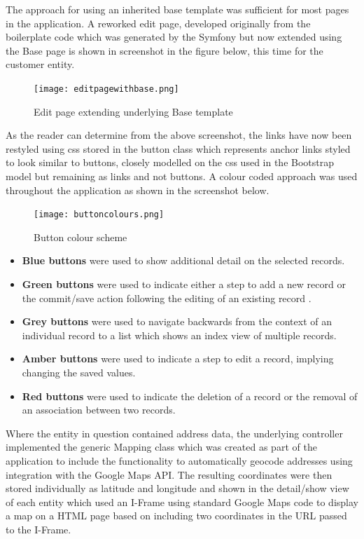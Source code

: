 \documentclass[a4paper,Times New Roman 11pt]{article}
\begin{document}
The approach for using an inherited base template was sufficient for most pages in the application. 
A reworked edit page, developed originally from the boilerplate code which was generated by the Symfony but now extended using the Base page is shown in screenshot in the figure below, this time for the customer entity.


 \begin{figure}[h!]
\texttt{[image: editpagewithbase.png]}
  \caption{Edit page extending underlying Base template}
  \label{fig:Edit page extending underlying Base template}
\end{figure}


As the reader can determine from the above screenshot, the links have now been restyled using css stored in the button class which represents anchor links styled to look similar to buttons, closely modelled on the css used in the Bootstrap model but remaining as links and not buttons. A colour coded approach was used throughout the application as shown in the screenshot below.
 \begin{figure}[h!]
\texttt{[image: buttoncolours.png]}
  \caption{Button colour scheme}
  \label{fig:Button colour scheme}
\end{figure}
\begin {itemize}

\item \textbf{Blue buttons} were used to show additional detail on the selected records.
\item \textbf{Green buttons} were used to indicate either a step to add a new record or the commit/save action following the editing of an existing record .
\item \textbf{Grey buttons} were used to navigate backwards from the context of an individual record to a list which shows an index view of multiple records.
\item \textbf{Amber buttons} were used to indicate a step to edit a record, implying changing the saved values.
\item \textbf{Red buttons} were used to indicate the deletion of a record or the removal of an association between two records.
\end {itemize}

Where the entity in question contained address data, the underlying controller implemented the generic Mapping class which was created as part of the application to include the functionality to automatically geocode addresses using integration with the Google Maps API. The resulting coordinates were then stored individually as latitude and longitude and shown in the detail/show view of each entity which used an I-Frame using standard Google Maps code to display a map on a HTML page based on including two coordinates in the URL passed to the I-Frame.
\end{document}

